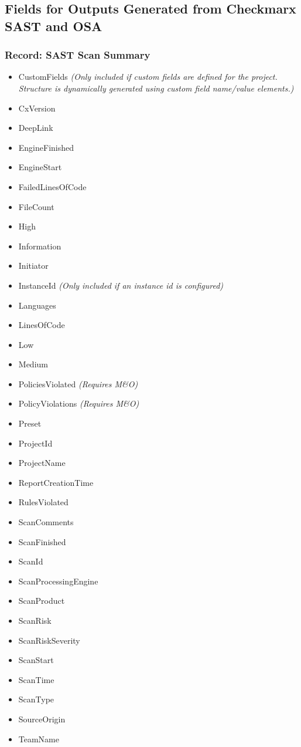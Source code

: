 \subsection{Fields for Outputs Generated from Checkmarx SAST and OSA}

\subsubsection{Record: SAST Scan Summary}

\begin{itemize}
    \item CustomFields \textit{(Only included if custom fields are defined for the project.  Structure is dynamically generated using custom field name/value elements.)}
    \item CxVersion
    \item DeepLink
    \item EngineFinished
    \item EngineStart
    \item FailedLinesOfCode
    \item FileCount
    \item High
    \item Information
    \item Initiator
    \item InstanceId \textit{(Only included if an instance id is configured)}
    \item Languages
    \item LinesOfCode
    \item Low
    \item Medium
    \item PoliciesViolated \textit{(Requires M\&O)}
    \item PolicyViolations \textit{(Requires M\&O)}
    \item Preset
    \item ProjectId
    \item ProjectName
    \item ReportCreationTime
    \item RulesViolated
    \item ScanComments
    \item ScanFinished
    \item ScanId
    \item ScanProcessingEngine
    \item ScanProduct
    \item ScanRisk
    \item ScanRiskSeverity
    \item ScanStart
    \item ScanTime
    \item ScanType
    \item SourceOrigin
    \item TeamName
\end{itemize}


